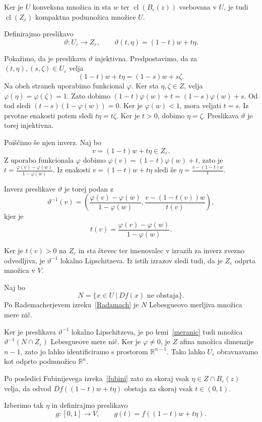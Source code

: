 \documentclass[mat2, tisk]{fmfdelo}
\begin{document}
\begin{dokaz}
Ker je $U$ konveksna množica in sta
$w$ ter $\operatorname{cl}(B_\varepsilon(z))$
vsebovana v $U$, je tudi
$\operatorname{cl}(Z_\varepsilon)$
kompaktna podmnožica množice $U$.

Definirajmo preslikavo
\[
\vartheta:U_\varepsilon\to Z_\varepsilon,
\qquad
\vartheta(t,\eta)=(1-t)w+t\eta.
\]

Pokažimo, da je preslikava $\vartheta$
injektivna. Predpostavimo, da za
$(t,\eta),(s,\zeta)\in U_\varepsilon$
velja
\[
(1-t)w+t\eta=(1-s)w+s\zeta.
\]
Na obeh straneh uporabimo funkcional
$\varphi$. Ker sta $\eta,\zeta\in Z$,
velja $\varphi(\eta)=\varphi(\zeta)=1$.
Zato dobimo
$(1-t)\varphi(w)+t =
(1-s)\varphi(w)+s$.
Od tod sledi
$(t-s)(1-\varphi(w))=0$.
Ker je $\varphi(w)<1$, mora veljati $t=s$.
Iz prvotne enakosti potem sledi
$t\eta=t\zeta$. Ker je $t>0$, dobimo
$\eta=\zeta$. Preslikava $\vartheta$
je torej injektivna.

Poiščimo še njen inverz.
Naj bo
\[
v=(1-t)w+t\eta\in Z_\varepsilon.
\]
Z uporabo funkcionala $\varphi$ dobimo
$\varphi(v) = (1-t)\varphi(w)+t$,
zato je
$t=
\frac{\varphi(v)-\varphi(w)}
{1-\varphi(w)}$.
Iz enakosti
$v=(1-t)w+t\eta$ sledi še
$\eta=\frac{v-(1-t)w}{t}$.

Inverz preslikave $\vartheta$ je torej
podan z
\[
\vartheta^{-1}(v)
=
\left(
\frac{\varphi(v)-\varphi(w)}
{1-\varphi(w)},
\frac{v-(1-t(v))w}{t(v)}
\right),
\]
kjer je
\[
t(v)=
\frac{\varphi(v)-\varphi(w)}
{1-\varphi(w)}.
\]

Ker je $t(v)>0$ na $Z_\varepsilon$
in sta števec ter imenovalec v izrazih
za inverz zvezno odvedljiva,
je $\vartheta^{-1}$ lokalno Lipschitzeva.
Iz istih izrazov sledi tudi, da je
$Z_\varepsilon$ odprta množica v $V$.

Naj bo
\[
N=\{x\in U ~|~ Df(x)\text{ ne obstaja}\}.
\]
Po Rademacherjevem izreku~\ref{Radamach} je $N$
Lebesgueovo merljiva množica mere nič.

Ker je preslikava $\vartheta^{-1}$
lokalno Lipschitzeva, je po lemi~\ref{meranic} tudi množica
$\vartheta^{-1}(N\cap Z_\varepsilon)$
Lebesgueove mere nič.
Ker je $\varphi\neq0$, je $Z$ afina množica
dimenzije $n-1$, zato jo lahko identificiramo
s prostorom $\mathbb{R}^{n-1}$.
Tako lahko $U_\varepsilon$ obravnavamo kot
odprto podmnožico $\mathbb{R}^n$.

Po posledici Fubinijevega izreka~\ref{fubini} zato za skoraj vsak
$\eta\in Z\cap B_\varepsilon(z)$
velja, da odvod $Df((1-t)w+t\eta)$
obstaja za skoraj vsak $t\in(0,1)$.

Izberimo tak $\eta$ in definirajmo
preslikavo
\[
g:[0,1]\to V,
\qquad
g(t)=f((1-t)w+t\eta).
\]


\end{dokaz}
\end{document}

